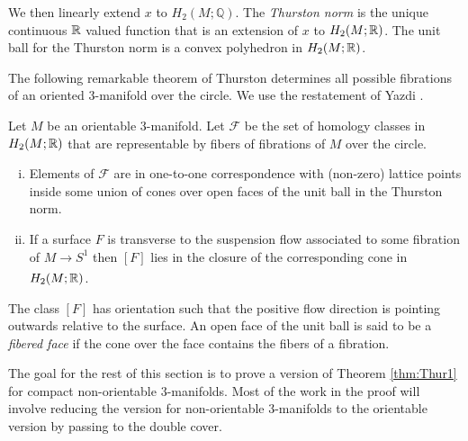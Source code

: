We then linearly extend $x$ to $H_2(M;\mathbb{Q})$.  The \emph{Thurston norm} is the unique continuous $\mathbb{R}$ valued function that is an extension of $x$ to $H_2(M;\mathbb{R})$.
The unit ball for the Thurston norm is a convex polyhedron in $H_2(M;\mathbb{R})$.%


The following remarkable theorem of Thurston \cite{thurston1986norm} determines all possible fibrations of an oriented 3-manifold over the circle.
We use the restatement of Yazdi \cite{yazdi2018pseudo}.
\begin{thm}[Thurston]
  \label{thm:Thur1}
  Let $M$ be an orientable 3-manifold.  Let $\mathcal{F}$ be the set of homology classes in $H_2(M; \mathbb{R})$ that are representable by fibers of fibrations of $M$ over the circle.
\begin{enumerate}[(i)]
\item Elements of $\mathcal{F}$ are in one-to-one correspondence with (non-zero) lattice points inside some union of cones over open faces of the unit ball in the Thurston norm.
\item If a surface $F$ is transverse to the suspension flow associated to some fibration of
  $M \xrightarrow[]{} S^1$ then $[F]$ lies in the closure of the corresponding cone in $H_2(M;\mathbb{R})$.
\end{enumerate}
\end{thm}
The class $[F]$ has orientation such that the positive flow direction is pointing outwards relative to the surface.
An open face of the unit ball is said to be a \emph{fibered face} if the cone over the face contains the fibers of a fibration.

The goal for the rest of this section is to prove a version of Theorem \ref{thm:Thur1} for compact non-orientable $3$-manifolds.
Most of the work in the proof will involve reducing the version for non-orientable $3$-manifolds to the orientable version by passing to the double cover.

